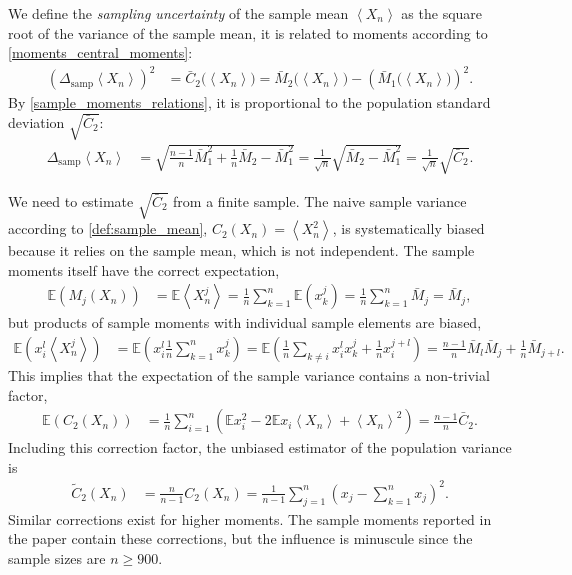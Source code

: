 \documentclass[11pt,a4paper]{article}
\renewcommand{\|}{\rule[-0.4ex]{0.2ex}{1.2em}}
\begin{document}
We define the \emph{sampling uncertainty} of the sample mean $\left \langle X_n \right \rangle $  as the square root of the variance of the sample mean, it is related to moments according to \cref{moments_central_moments}:
\begin{align}\label{def:sampling_uncertainty}
	\left(\Delta_{\text{samp}} \left \langle X_n \right \rangle \right)^2&= \bar C_2 \big(\left \langle X_n \right \rangle  \big)  = \bar M_2 \big(\left \langle X_n \right \rangle  \big) -\left( \bar M_1 \big(\left \langle X_n \right \rangle  \big) \right)  ^2.
\end{align}
By \cref{sample_moments_relations}, it is proportional to the population standard deviation  $\sqrt{\bar C_2}$:
\begin{align}\label{uncertainty_sampling_theo} 
	\Delta_{\text{samp}} \left \langle X_n \right \rangle  &= \sqrt{\frac{n-1}{n} \bar M_1^2 + \frac 1 n \bar M_2 - \bar M_1^2 } = \frac{1}{\sqrt n} \sqrt{\bar M_2-\bar M_1^2} = \frac{1}{\sqrt n } \sqrt{\bar C_2}.
\end{align}

We need to estimate $\sqrt{\bar C_2}$ from a finite sample. The naive sample variance according to \cref{def:sample_mean}, $C_2(X_n   )=\left \langle X_n^2 \right \rangle  $, is systematically biased because it relies on the sample mean, which  is not independent. The sample moments itself have the correct expectation,
\begin{align*}
	\mathbb E \left( M_j(X_n) \right)   &=\mathbb E \left \langle X_n^j \right \rangle = \frac 1 n \sum_{k=1}^n \mathbb E(x_k^j) = \frac 1 n \sum_{k=1}^n \bar M_j = \bar M_j,
\end{align*}
but products of sample moments with individual sample elements are biased,
\begin{align*}
	\mathbb E \left( x_i^l \left \langle X_n^j \right \rangle   \right) &= \mathbb E \left( x_i^l \frac 1 n \sum_{k=1}^n x_k^j \right) = \mathbb E \left(  \frac 1 n \sum_{k \neq i} x_i^l x_k^j +\frac 1 n x_i^{j+l}\right) = \frac{n-1}{n} \bar M_l \bar M_j + \frac 1 n \bar M_{j+l}.
\end{align*}
This implies that the expectation of the sample variance contains  a non-trivial factor,
\begin{align*}
	\mathbb E \left( C_2(X_n) \right) &= \frac 1 n \sum_{i=1}^n \left( \mathbb E x_i^2 - 2 \mathbb E x_i \left \langle X_n \right \rangle + \left \langle X_n \right \rangle ^2 \right) = \frac{n-1}{n} \bar C_2.
\end{align*}
Including this correction factor, the unbiased estimator of the population variance is
\begin{align}\label{def:sample_variance}
	\tilde C_2(X_n) &= \frac{n}{n-1}C_2 (X_n)=  \frac{1}{n-1}\sum_{j=1}^n \left( x_j  -  \sum_{k=1}^n x_j  \right) ^2 .
\end{align}
Similar corrections exist for higher moments.
The sample moments reported in the paper contain these corrections, but the influence is minuscule since the sample sizes  are $n \geq 900$. 
\end{document}
